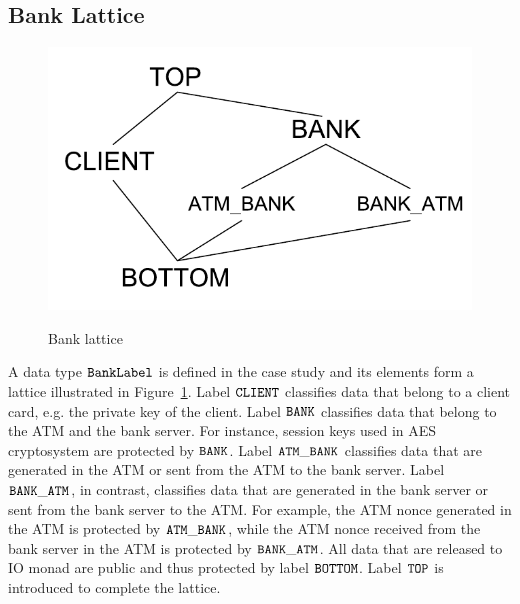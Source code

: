 \documentclass{report}
\newcommand{\co}[1]{$\cod{#1}$}
\begin{document}
\subsection{Bank Lattice}
\begin{figure}[t]


\begin{center}
\includegraphics[scale=0.5]{bank.pdf} \\
\end{center}

\caption{Bank lattice}
\label{fig:banklattice}
\end{figure}
A data type \co{BankLabel} is defined in the case study and its elements form a lattice illustrated 
in Figure~\ref{fig:banklattice}.
Label \co{CLIENT} classifies data that belong to a client card, e.g. the private key of the client.
Label \co{BANK} classifies data that belong to the ATM and the bank server. For instance, session keys used in
AES cryptosystem are
protected by \co{BANK}. Label \co{ATM\_BANK} classifies data that are generated in the ATM or sent from the ATM
to the bank server. Label \co{BANK\_ATM}, in contrast, classifies data that are generated in the bank server or
sent from the bank server to the ATM.
For example, the ATM nonce generated in the ATM is protected by \co{ATM\_BANK},
while the ATM nonce received from the bank server in the ATM is protected by \co{BANK\_ATM}. 
All data that are released to IO monad are public and thus protected by label \co{BOTTOM}.
Label \co{TOP} is introduced to complete the lattice.
\end{document}
